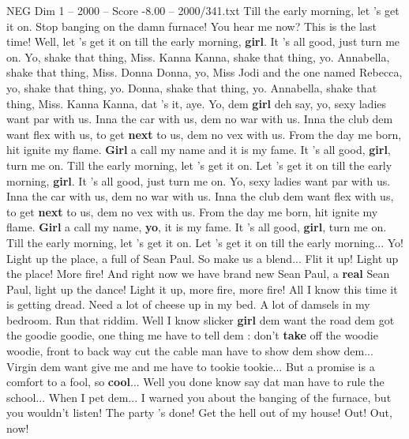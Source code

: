 \begin{textsample}{NEG Dim 1 – 2000 – Score -8.00 – 2000/341.txt}
Till the early morning, let 's get it on.
Stop banging on the damn furnace!
You hear me now?
This is the last time!
Well, let 's get it on till the early morning, \textbf{girl}.
It 's all good, just turn me on.
Yo, shake that thing, Miss.
Kanna Kanna, shake that thing, yo.
Annabella, shake that thing, Miss.
Donna Donna, yo, Miss Jodi and the one named Rebecca, yo, shake that thing, yo.
Donna, shake that thing, yo.
Annabella, shake that thing, Miss.
Kanna Kanna, dat 's it, aye.
Yo, dem \textbf{girl} deh say, yo, sexy ladies want par with us.
Inna the car with us, dem no war with us.
Inna the club dem want flex with us, to get \textbf{next} to us, dem no vex with us.
From the day me born, hit ignite my flame. \textbf{Girl} a call my name and it is my fame.
It 's all good, \textbf{girl}, turn me on.
Till the early morning, let 's get it on.
Let 's get it on till the early morning, \textbf{girl}.
It 's all good, just turn me on.
Yo, sexy ladies want par with us.
Inna the car with us, dem no war with us.
Inna the club dem want flex with us, to get \textbf{next} to us, dem no vex with us.
From the day me born, hit ignite my flame. \textbf{Girl} a call my name, \textbf{yo}, it is my fame.
It 's all good, \textbf{girl}, turn me on.
Till the early morning, let 's get it on.
Let 's get it on till the early morning...
Yo!
Light up the place, a full of Sean Paul.
So make us a blend...
Flit it up!
Light up the place!
More fire!
And right now we have brand new Sean Paul, a \textbf{real} Sean Paul, light up the dance!
Light it up, more fire, more fire!
All I know this time it is getting dread.
Need a lot of cheese up in my bed.
A lot of damsels in my bedroom.
Run that riddim.
Well I know slicker \textbf{girl} dem want the road dem got the goodie goodie, one thing me have to tell dem : don't \textbf{take} off the woodie woodie, front to back way cut the cable man have to show dem show dem...
Virgin dem want give me and me have to tookie tookie...
But a promise is a comfort to a fool, so \textbf{cool}...
Well you done know say dat man have to rule the school...
When I pet dem...
I warned you about the banging of the furnace, but you wouldn't listen!
The party 's done!
Get the hell out of my house!
Out!
Out, now!

\end{textsample}
